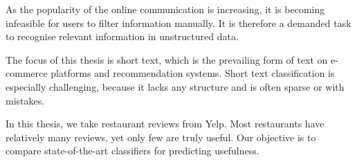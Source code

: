 \documentclass[12pt]{report}
\begin{document}

As the popularity of the online communication is increasing,
it is becoming infeasible for users to filter information manually.
It is therefore a demanded task to recognise relevant information in unstructured data.

The focus of this thesis is short text,
which is the prevailing form of text on e-commerce platforms and recommendation systems.
Short text classification is especially challenging, because it lacks any structure
and is often sparse or with mistakes.

In this thesis, we take restaurant reviews from Yelp.
Most restaurants have relatively many reviews, yet only few are truly useful.
Our objective is to compare state-of-the-art classifiers for predicting usefulness.
\end{document}
